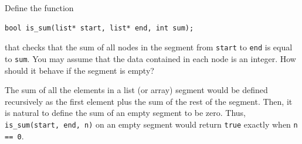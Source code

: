 \begin{flex}
\begin{exercise}
\label{ex:linked-list_sum}
Define the function
\begin{lstlisting}[language={[C0]C}]
bool is_sum(list* start, list* end, int sum);
\end{lstlisting}
that checks that the sum of all nodes in the segment from
\lstinline'start' to \lstinline'end' is equal to \lstinline'sum'.  You
may assume that the data contained in each node is an integer.  How
should it behave if the segment is empty?
\end{exercise}


\begin{solution}
\label{ex:linked-list_sum-solved}
  The sum of all the elements in a list (or
  array) segment would be defined recursively as the first element
  plus the sum of the rest of the segment.  Then, it is natural to
  define the sum of an empty segment to be zero.   Thus,
  \lstinline'is_sum(start, end, n)' on an empty segment would return
  \lstinline'true' exactly when \lstinline'n == 0'.
\par\medskip\noindent\usebox{\lstbox}\par
\end{solution}
\end{flex}


